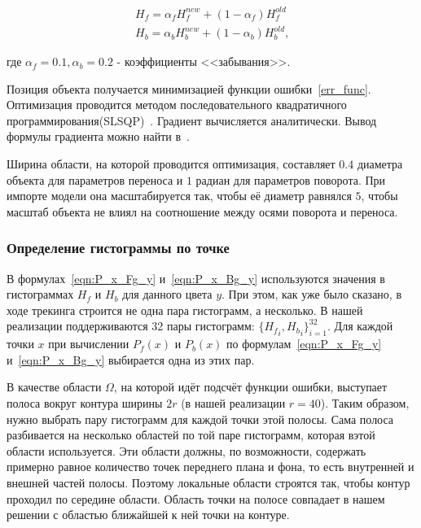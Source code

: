 \begin{equation}
\begin{array}{c}
H_{f} = \alpha_f H_{f}^{new} + (1 - \alpha_f) H_f^{old} \\
H_{b} = \alpha_b H_{b}^{new} + (1 - \alpha_b) H_b^{old}
\text{,}
\end{array}
\end{equation}

где $\alpha_f = 0.1, \alpha_b = 0.2$ - коэффициенты <<забывания>>.

Позиция объекта получается минимизацией функции ошибки~\ref{err_func}.
Оптимизация проводится методом последовательного квадратичного
программирования(SLSQP)~\cite{SLSQP}.
Градиент вычисляется аналитически.
Вывод формулы градиента можно найти в~\cite{Tjaden2018}.

Ширина области, на которой проводится оптимизация, составляет $0.4$ диаметра
объекта для параметров переноса и $1$ радиан для параметров поворота.
При импорте модели она масштабируется так, чтобы её диаметр равнялся $5$, чтобы
масштаб объекта не влиял на соотношение между осями поворота и переноса.



\subsubsection*{Определение гистограммы по точке}
В формулах~\ref{eqn:P_x_Fg_y} и~\ref{eqn:P_x_Bg_y} используются значения в
гистограммах $H_f$ и $H_b$ для данного цвета $y$.
При этом, как уже было сказано, в ходе трекинга строится не одна пара
гистограмм, а несколько.
В нашей реализации поддерживаются 32 пары гистограмм: $\{{H_f}_i, {H_b}_i\}_{i
= 1}^{32}$.
Для каждой точки $x$ при вычислении $P_f(x)$ и $P_b(x)$ по
формулам~\ref{eqn:P_x_Fg_y} и~\ref{eqn:P_x_Bg_y} выбирается одна из этих пар.

В качестве области $\Omega$, на которой идёт подсчёт функции ошибки, выступает
полоса вокруг контура ширины $2r$ (в нашей реализации $r = 40$).
Таким образом, нужно выбрать пару гистограмм для каждой точки этой полосы.
Сама полоса разбивается на несколько областей по той паре гистограмм, которая
вэтой области используется.
Эти области должны, по возможности, содержать примерно равное количество точек
переднего плана и фона, то есть внутренней и внешней частей полосы.
Поэтому локальные области строятся так, чтобы контур проходил по середине
области.
Область точки на полосе совпадает в нашем решении с областью ближайшей к ней
точки на контуре.

